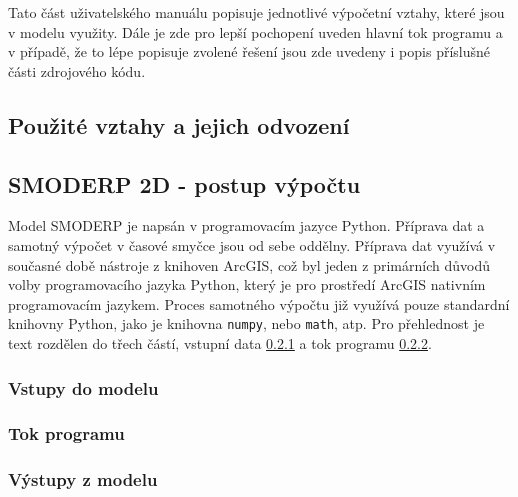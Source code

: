 %

Tato část uživatelského manuálu popisuje jednotlivé výpočetní vztahy, které jsou v modelu využity. Dále je zde pro lepší pochopení uveden hlavní tok programu a v případě, že to lépe popisuje zvolené řešení jsou zde uvedeny i popis příslušné části zdrojového kódu.


\subsection{Použité vztahy a jejich odvození} \label{modelovani}


	


\subsection{SMODERP 2D - postup výpočtu} \label{vypocet}

Model SMODERP je napsán v programovacím jazyce Python. Příprava dat a samotný výpočet v časové smyčce jsou od sebe oddělny. Příprava dat využívá v současné době nástroje z knihoven ArcGIS, což byl jeden z primárních důvodů volby  programovacího jazyka Python, který je pro prostředí ArcGIS nativním programovacím jazykem. Proces samotného výpočtu již využívá pouze standardní knihovny Python, jako je knihovna \texttt{numpy}, nebo \texttt{math}, atp. Pro přehlednost je text rozdělen do třech částí, vstupní data \ref{kap:vstupy} a tok programu \ref{kap:tok}. %

%	
		
	
	\subsubsection{Vstupy do modelu} \label{kap:vstupy}
	 
	
	\subsubsection{Tok programu} \label{kap:tok}
	
	
	\subsubsection{Výstupy z modelu} \label{kap:vystupy}
	

